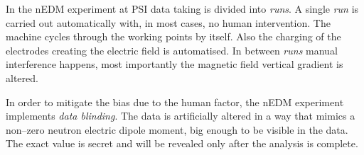 In the nEDM experiment at PSI data taking is divided into \emph{runs}. A single \emph{run} is carried out automatically with, in most cases, no human intervention. The machine cycles through the working points by itself. Also the charging of the electrodes creating the electric field is automatised. In between \emph{runs} manual interference happens, most importantly the magnetic field vertical gradient is altered.

In order to mitigate the bias due to the human factor, the nEDM experiment implements \emph{data blinding}. The data is artificially altered in a way that mimics a non--zero neutron electric dipole moment, big enough to be visible in the data. The exact value is secret and will be revealed only after the analysis is complete.
